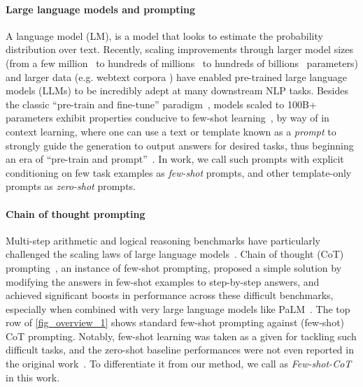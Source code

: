 \documentclass{article}
\newcommand{\theirs}{Few-shot-CoT\xspace}
\begin{document}
\paragraph{Large language models and prompting}
A language model (LM), is a model that looks to estimate the probability distribution over text. Recently, scaling improvements through larger model sizes (from a few million~\citep{merity2016pointer} to hundreds of millions~\citep{bert} to hundreds of billions~\citep{brown2020language} parameters) and larger data (e.g. webtext corpora \citep{gao2020pile}) have enabled pre-trained large language models (LLMs) to be incredibly adept at many downstream NLP tasks. Besides the classic ``pre-train and fine-tune'' paradigm~\citep{liu2021pre}, models scaled to 100B+ parameters exhibit properties conducive to few-shot learning~\citep{brown2020language}, by way of in context learning, where one can use a text or template known as a \emph{prompt} to strongly guide the generation to output answers for desired tasks, thus beginning an era of ``pre-train and prompt''~\citep{liu2021makes}. In work, we call such prompts with explicit conditioning on few task examples as \textit{few-shot} prompts, and other template-only prompts as \textit{zero-shot} prompts. 

\paragraph{Chain of thought prompting}
Multi-step arithmetic and logical reasoning benchmarks have particularly challenged the scaling laws of large language models~\citep{gopher}. Chain of thought (CoT) prompting~\citep{cot_wei}, an instance of few-shot prompting, proposed a simple solution by modifying the answers in few-shot examples to step-by-step answers, and achieved significant boosts in performance across these difficult benchmarks, especially when combined with very large language models like PaLM~\citep{palm}. The top row of \autoref{fig_overview_1} shows standard few-shot prompting against (few-shot) CoT prompting. Notably, few-shot learning was taken as a given for tackling such difficult tasks, and the zero-shot baseline performances were not even reported in the original work~\citep{cot_wei}. To differentiate it from our method, we call \citet{cot_wei} as \textit{\theirs} in this work.   

\end{document}
